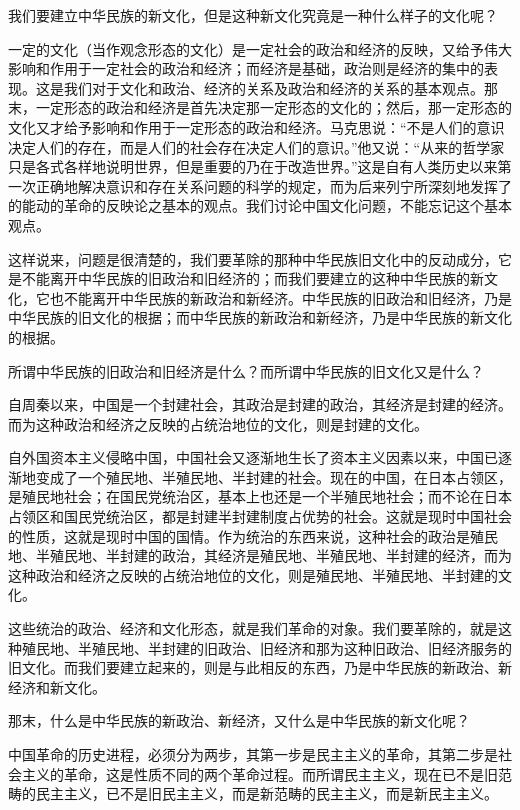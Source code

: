 我们要建立中华民族的新文化，但是这种新文化究竟是一种什么样子的文化呢？

一定的文化（当作观念形态的文化）是一定社会的政治和经济的反映，又给予伟大影响和作用于一定社会的政治和经济；而经济是基础，政治则是经济的集中的表现。这是我们对于文化和政治、经济的关系及政治和经济的关系的基本观点。那末，一定形态的政治和经济是首先决定那一定形态的文化的；然后，那一定形态的文化又才给予影响和作用于一定形态的政治和经济。马克思说：“不是人们的意识决定人们的存在，而是人们的社会存在决定人们的意识。”他又说：“从来的哲学家只是各式各样地说明世界，但是重要的乃在于改造世界。”这是自有人类历史以来第一次正确地解决意识和存在关系问题的科学的规定，而为后来列宁所深刻地发挥了的能动的革命的反映论之基本的观点。我们讨论中国文化问题，不能忘记这个基本观点。

这样说来，问题是很清楚的，我们要革除的那种中华民族旧文化中的反动成分，它是不能离开中华民族的旧政治和旧经济的；而我们要建立的这种中华民族的新文化，它也不能离开中华民族的新政治和新经济。中华民族的旧政治和旧经济，乃是中华民族的旧文化的根据；而中华民族的新政治和新经济，乃是中华民族的新文化的根据。

所谓中华民族的旧政治和旧经济是什么？而所谓中华民族的旧文化又是什么？

自周秦以来，中国是一个封建社会，其政治是封建的政治，其经济是封建的经济。而为这种政治和经济之反映的占统治地位的文化，则是封建的文化。

自外国资本主义侵略中国，中国社会又逐渐地生长了资本主义因素以来，中国已逐渐地变成了一个殖民地、半殖民地、半封建的社会。现在的中国，在日本占领区，是殖民地社会；在国民党统治区，基本上也还是一个半殖民地社会；而不论在日本占领区和国民党统治区，都是封建半封建制度占优势的社会。这就是现时中国社会的性质，这就是现时中国的国情。作为统治的东西来说，这种社会的政治是殖民地、半殖民地、半封建的政治，其经济是殖民地、半殖民地、半封建的经济，而为这种政治和经济之反映的占统治地位的文化，则是殖民地、半殖民地、半封建的文化。

这些统治的政治、经济和文化形态，就是我们革命的对象。我们要革除的，就是这种殖民地、半殖民地、半封建的旧政治、旧经济和那为这种旧政治、旧经济服务的旧文化。而我们要建立起来的，则是与此相反的东西，乃是中华民族的新政治、新经济和新文化。

那末，什么是中华民族的新政治、新经济，又什么是中华民族的新文化呢？

中国革命的历史进程，必须分为两步，其第一步是民主主义的革命，其第二步是社会主义的革命，这是性质不同的两个革命过程。而所谓民主主义，现在已不是旧范畴的民主主义，已不是旧民主主义，而是新范畴的民主主义，而是新民主主义。

